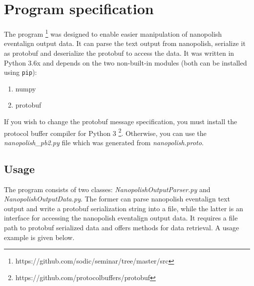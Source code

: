 \documentclass[times, utf, seminar]{fer}
\begin{document}
\section{Program specification}
The program 
\footnote{https://github.com/sodic/seminar/tree/master/src}
was designed to enable easier manipulation of nanopolish eventalign 
output data. It can parse the text output from nanopolish, serialize it as protobuf and 
deserialize the protobuf to access the data. It was written in Python 3.6x and
depends on the two non-built-in modules (both can be installed using \texttt{pip}):
\begin{enumerate}
	\item numpy
	\item protobuf
\end{enumerate}
 If you wish to change the protobuf message
specification, you must install the protocol buffer compiler for Python 3
\footnote{https://github.com/protocolbuffers/protobuf}.
Otherwise, you can use the \textit{nanopolish\_pb2.py} file which was generated from
\textit{nanopolish.proto}.

\subsection{Usage}
The program consists of two classes: \textit{NanopolishOutputParser.py} and 
\textit{NanopolishOutputData.py}. The former can parse nanopolish 
eventalign text output and write a protobuf serialization string into a file, while
the latter is an interface for accessing the nanopolish eventalign output data. It requires 
a file path to protobuf serialized data and offers methods for data retrieval. 
A usage example is given below. 
\end{document}
